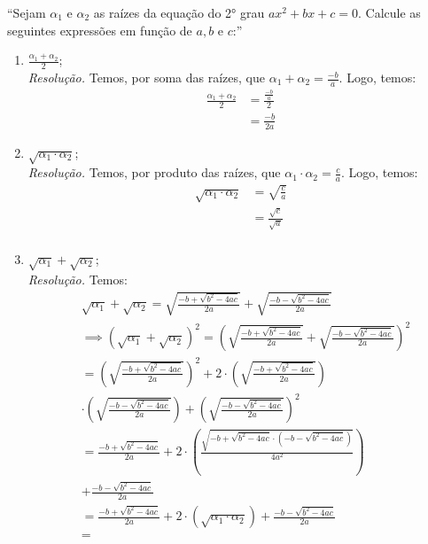 \enquote{Sejam $\alpha_1$ e $\alpha_2$ as raízes da equação do 2° grau $ax^2 + bx + c = 0$. Calcule as seguintes expressões em função de $a, b \text{ e } c$:}
\begin{enumerate}
    \item $\frac{\alpha_1 + \alpha_2}{2}$;
    \\
    \emph{Resolução.} Temos, por soma das raízes, que $\alpha_1 + \alpha_2 = \frac{-b}{a}$. Logo, temos:
    \begin{align*}
        \frac{\alpha_1 + \alpha_2}{2} & = \frac{\frac{-b}{a}}{2} \\ & =
        \frac{-b}{2a}
    \end{align*}
    \item $\sqrt{\alpha_1 \cdot \alpha_2}$;
    \\
    \emph{Resolução.} Temos, por produto das raízes, que $\alpha_1 \cdot \alpha_2 = \frac{c}{a}$. Logo, temos:
    \begin{align*}
        \sqrt{\alpha_1 \cdot \alpha_2} & = \sqrt{\frac{c}{a}} \\ & =
        \frac{\sqrt{c}}{\sqrt{a}} \\
    \end{align*}
    \item $\sqrt{\alpha_1} + \sqrt{\alpha_2}$;
    \\
    \emph{Resolução.} Temos:
    \begin{align*}
        &\sqrt{\alpha_1} + \sqrt{\alpha_2} =
        \sqrt{\frac{-b + \sqrt{b^2 - 4ac}}{2a}} + \sqrt{\frac{-b - \sqrt{b^2 - 4ac}}{2a}} 
        \\ & \implies
        (\sqrt{\alpha_1} + \sqrt{\alpha_2})^2 = (\sqrt{\frac{-b + \sqrt{b^2 - 4ac}}{2a}} + \sqrt{\frac{-b - \sqrt{b^2 - 4ac}}{2a}})^2
        \\ & =
        (\sqrt{\frac{-b + \sqrt{b^2 - 4ac}}{2a}})^2 + 
         2\cdot (\sqrt{\frac{-b + \sqrt{b^2 - 4ac}}{2a}}) \\ &\cdot (\sqrt{\frac{-b - \sqrt{b^2 - 4ac}}{2a}}) + (\sqrt{\frac{-b - \sqrt{b^2 - 4ac}}{2a}})^2 \\ & =
        \frac{-b + \sqrt{b^2 - 4ac}}{2a} +
        2 \cdot (\frac{\sqrt{-b + \sqrt{b^2 - 4ac} \cdot (-b - \sqrt{b^2 - 4ac})}}{4a^2})
        \\ & + \frac{-b - \sqrt{b^2 - 4ac}}{2a} 
        \\ & =
        \frac{-b + \sqrt{b^2 - 4ac}}{2a} + 2 \cdot(\sqrt{\alpha_1 \cdot \alpha_2}) + \frac{-b - \sqrt{b^2 - 4ac}}{2a}
        \\ & =

\end{align*}
\end{enumerate}
